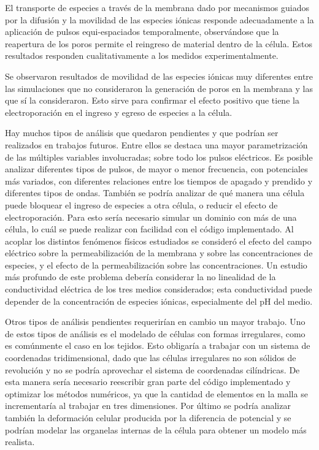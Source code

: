 El transporte de especies a través de la membrana dado por mecanismos guiados por la difusión y la movilidad de las especies iónicas responde adecuadamente a la aplicación de pulsos equi-espaciados temporalmente, observándose que la reapertura de los poros permite el reingreso de material dentro de la célula. Estos resultados responden cualitativamente a los medidos experimentalmente.

Se observaron resultados de movilidad de las especies iónicas muy diferentes entre las simulaciones que no consideraron la generación de poros en la membrana y las que sí la consideraron. Esto sirve para confirmar el efecto positivo que tiene la electroporación en el ingreso y egreso de especies a la célula.

Hay muchos tipos de análisis que quedaron pendientes y que podrían ser realizados en trabajos futuros. Entre ellos se destaca una mayor parametrización de las múltiples variables involucradas; sobre todo los pulsos eléctricos. Es posible analizar diferentes tipos de pulsos, de mayor o menor frecuencia, con potenciales más variados, con diferentes relaciones entre los tiempos de apagado y prendido y diferentes tipos de ondas. También se podría analizar de qué manera una célula puede bloquear el ingreso de especies a otra célula, o reducir el efecto de electroporación. Para esto sería necesario simular un dominio con más de una célula, lo cuál se puede realizar con facilidad con el código implementado. Al acoplar los distintos fenómenos físicos estudiados se consideró el efecto del campo eléctrico sobre la permeabilización de la membrana y sobre las concentraciones de especies, y el efecto de la permeabilización sobre las concentraciones. Un estudio más profundo de este problema debería considerar la no linealidad de la conductividad eléctrica de los tres medios considerados; esta conductividad puede depender de la concentración de especies iónicas, especialmente del pH del medio.

Otros tipos de análisis pendientes requerirían en cambio un mayor trabajo. Uno de estos tipos de análisis es el modelado de células con formas irregulares, como es comúnmente el caso en los tejidos. Esto obligaría a trabajar con un sistema de coordenadas tridimensional, dado que las células irregulares no son sólidos de revolución y no se podría aprovechar el sistema de coordenadas cilíndricas. De esta manera sería necesario reescribir gran parte del código implementado y optimizar los métodos numéricos, ya que la cantidad de elementos en la malla se incrementaría al trabajar en tres dimensiones. Por último se podría analizar también la deformación celular producida por la diferencia de potencial y se podrían modelar las organelas internas de la célula para obtener un modelo más realista.

